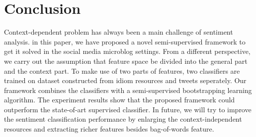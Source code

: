 \documentclass{llncs}
\begin{document}
\section{Conclusion}
Context-dependent problem has always been a main challenge of sentiment analysis.
in this paper, we have proposed a novel semi-supervised framework to get it solved in the social media microblog settings. 
From a different perspective, we carry out the assumption that feature space be divided into the general part and the context part.
To make use of two parts of features, two classifiers are trained on dataset constructed from idiom resources and tweets seperately. 
Our framework combines the classifiers with a semi-supervised bootstrapping learning algorithm. 
The experiment results show that the proposed framework could outperform the state-of-art supervised classifier. 
In future, we will try to improve the sentiment classification performance by enlarging the context-independent resources and extracting richer features besides bag-of-words feature.



\end{document}
